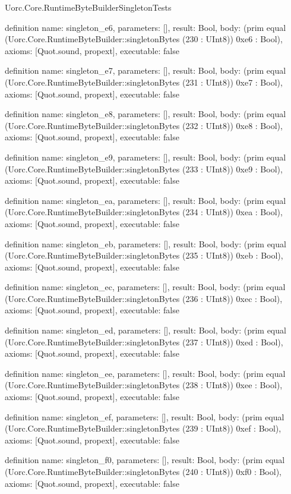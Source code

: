 \begin{lexlean}{Uorc.Core.RuntimeByteBuilderSingletonTests}
\begin{semanticmodule}
definition{
  name: singleton_e6,
  parameters: [],
  result: Bool,
  body: (prim equal (Uorc.Core.RuntimeByteBuilder::singletonBytes (230 : UInt8)) 0xe6 : Bool),
  axioms: [Quot.sound, propext],
  executable: false
}

definition{
  name: singleton_e7,
  parameters: [],
  result: Bool,
  body: (prim equal (Uorc.Core.RuntimeByteBuilder::singletonBytes (231 : UInt8)) 0xe7 : Bool),
  axioms: [Quot.sound, propext],
  executable: false
}

definition{
  name: singleton_e8,
  parameters: [],
  result: Bool,
  body: (prim equal (Uorc.Core.RuntimeByteBuilder::singletonBytes (232 : UInt8)) 0xe8 : Bool),
  axioms: [Quot.sound, propext],
  executable: false
}

definition{
  name: singleton_e9,
  parameters: [],
  result: Bool,
  body: (prim equal (Uorc.Core.RuntimeByteBuilder::singletonBytes (233 : UInt8)) 0xe9 : Bool),
  axioms: [Quot.sound, propext],
  executable: false
}

definition{
  name: singleton_ea,
  parameters: [],
  result: Bool,
  body: (prim equal (Uorc.Core.RuntimeByteBuilder::singletonBytes (234 : UInt8)) 0xea : Bool),
  axioms: [Quot.sound, propext],
  executable: false
}

definition{
  name: singleton_eb,
  parameters: [],
  result: Bool,
  body: (prim equal (Uorc.Core.RuntimeByteBuilder::singletonBytes (235 : UInt8)) 0xeb : Bool),
  axioms: [Quot.sound, propext],
  executable: false
}

definition{
  name: singleton_ec,
  parameters: [],
  result: Bool,
  body: (prim equal (Uorc.Core.RuntimeByteBuilder::singletonBytes (236 : UInt8)) 0xec : Bool),
  axioms: [Quot.sound, propext],
  executable: false
}

definition{
  name: singleton_ed,
  parameters: [],
  result: Bool,
  body: (prim equal (Uorc.Core.RuntimeByteBuilder::singletonBytes (237 : UInt8)) 0xed : Bool),
  axioms: [Quot.sound, propext],
  executable: false
}

definition{
  name: singleton_ee,
  parameters: [],
  result: Bool,
  body: (prim equal (Uorc.Core.RuntimeByteBuilder::singletonBytes (238 : UInt8)) 0xee : Bool),
  axioms: [Quot.sound, propext],
  executable: false
}

definition{
  name: singleton_ef,
  parameters: [],
  result: Bool,
  body: (prim equal (Uorc.Core.RuntimeByteBuilder::singletonBytes (239 : UInt8)) 0xef : Bool),
  axioms: [Quot.sound, propext],
  executable: false
}

definition{
  name: singleton_f0,
  parameters: [],
  result: Bool,
  body: (prim equal (Uorc.Core.RuntimeByteBuilder::singletonBytes (240 : UInt8)) 0xf0 : Bool),
  axioms: [Quot.sound, propext],
  executable: false
}


\end{semanticmodule}
\end{lexlean}
